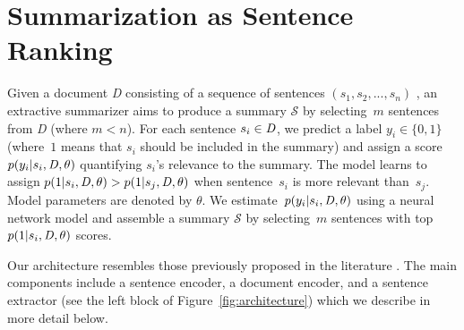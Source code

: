 \documentclass[11pt,a4paper]{article}
\newcommand\doc{{\it D }}
\newcommand\sentseq{{$(s_1, s_2, ..., s_n)$} }
\begin{document}
\begin{figure*}[t!]
{
  }
  \caption{Extractive summarization model with reinforcement learning:
    a hierarchical encoder-decoder model ranks sentences for their
    extract-worthiness and a candidate summary is assembled from the
    top ranked sentences; the REWARD generator compares the candidate
    against the gold summary to give a reward which is used in the
    REINFORCE algorithm \protect\cite{Williams:1992} to update the
    model.} \label{fig:architecture}
\end{figure*}


\section{Summarization as Sentence Ranking}
\label{sec:extr-summ-as}







Given a document \doc consisting of a sequence of sentences \sentseq, an
extractive summarizer aims to produce a summary $\mathcal{S}$ by
selecting~$m$ sentences from \doc (where $m < n$). For each sentence
\mbox{$s_i \in \doc$}, we predict a label $y_i \in \{0,1\}$ (where~$1$
means that $s_i$ should be included in the summary) and assign a score
$p(y_i| s_i,\doc,\theta)$ quantifying $s_i$'s relevance to the
summary.  The model learns to assign $p(1| s_i,\doc,\theta) > p(1|
s_j,\doc,\theta)$ when sentence~$s_i$ is more relevant
than~$s_j$. Model parameters are denoted by $\theta$.  We
estimate~$p(y_i| s_i,\doc,\theta)$ using a neural network model and
assemble a summary $\mathcal{S}$ by selecting~$m$ sentences with top
$p(1| s_i,\doc,\theta)$ scores.

Our architecture resembles those previously proposed in the literature
\cite{jp-acl16,nallapati17,narayan-arxiv17}.  The main components
include a sentence encoder, a document encoder, and a sentence
extractor (see the left block of Figure~\ref{fig:architecture}) which
we describe in more detail below.
\end{document}

